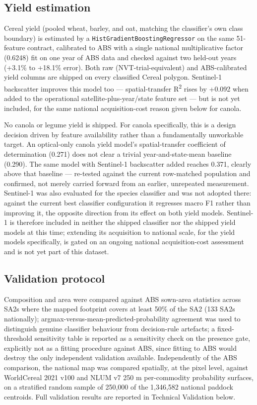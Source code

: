 \subsection*{Yield estimation}\label{yield-estimation}

Cereal yield (pooled wheat, barley, and oat, matching the classifier's own class boundary) is estimated by a \texttt{HistGradientBoostingRegressor} on the same 51-feature contract, calibrated to ABS with a single national multiplicative factor (0.6248) fit on one year of ABS data and checked against two held-out years (+3.1\% to +18.1\% error). Both raw (NVT-trial-equivalent) and ABS-calibrated yield columns are shipped on every classified Cereal polygon. Sentinel-1 backscatter improves this model too --- spatial-transfer R\textsuperscript{2} rises by +0.092 when added to the operational satellite-plus-year/state feature set --- but is not yet included, for the same national acquisition-cost reason given below for canola.

No canola or legume yield is shipped. For canola specifically, this is a design decision driven by feature availability rather than a fundamentally unworkable target. An optical-only canola yield model's spatial-transfer coefficient of determination (0.271) does not clear a trivial year-and-state-mean baseline (0.290). The same model with Sentinel-1 backscatter added reaches 0.371, clearly above that baseline --- re-tested against the current row-matched population and confirmed, not merely carried forward from an earlier, unrepeated measurement. Sentinel-1 was also evaluated for the species classifier and was not adopted there: against the current best classifier configuration it regresses macro F1 rather than improving it, the opposite direction from its effect on both yield models. Sentinel-1 is therefore included in neither the shipped classifier nor the shipped yield models at this time; extending its acquisition to national scale, for the yield models specifically, is gated on an ongoing national acquisition-cost assessment and is not yet part of this dataset.

\subsection*{Validation protocol}\label{validation-protocol}

Composition and area were compared against ABS sown-area statistics across SA2s where the mapped footprint covers at least 50\% of the SA2 (133 SA2s nationally); argmax-versus-mean-predicted-probability agreement was used to distinguish genuine classifier behaviour from decision-rule artefacts; a fixed-threshold sensitivity table is reported as a sensitivity check on the presence gate, explicitly not as a fitting procedure against ABS, since fitting to ABS would destroy the only independent validation available. Independently of the ABS comparison, the national map was compared spatially, at the pixel level, against WorldCereal 2021 v100 and NLUM v7 250 m per-commodity probability surfaces, on a stratified random sample of 250,000 of the 1,346,582 national paddock centroids. Full validation results are reported in Technical Validation below.

